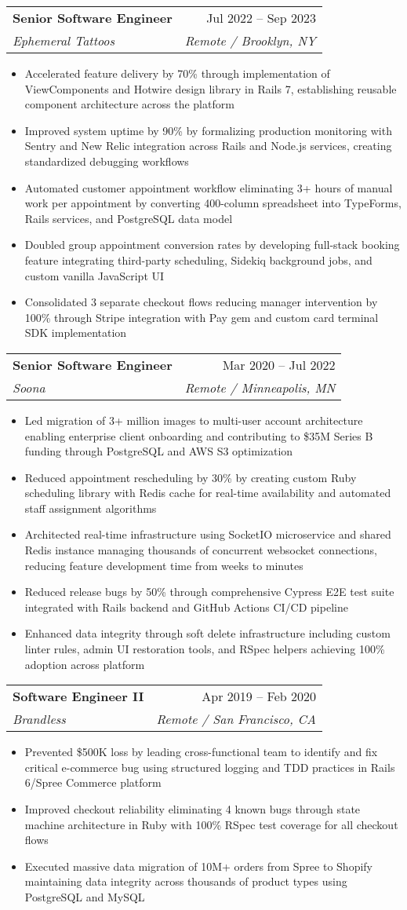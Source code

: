 \documentclass[letterpaper,12pt]{article}
\makeatletter
\newcommand{\resumeItem}[1]{
  \item\small{
    {#1 \vspace{-2pt}}
  }
}
\newcommand{\resumeSubheading}[4]{
  \vspace{-2pt}\item
    \begin{tabular*}{0.97\textwidth}[t]{l@{\extracolsep{\fill}}r}
      \textbf{#1} & #2 \\
      \textit{\small#3} & \textit{\small #4} \\
    \end{tabular*}\vspace{-7pt}
}
\newcommand{\resumeItemListStart}{\begin{itemize}}
\newcommand{\resumeItemListEnd}{\end{itemize}\vspace{-5pt}}
\makeatother
\begin{document}
    \resumeSubheading
      {Senior Software Engineer}{Jul 2022 – Sep 2023}
      {Ephemeral Tattoos}{Remote / Brooklyn, NY}
      \resumeItemListStart
        \resumeItem{Accelerated feature delivery by 70\% through implementation of ViewComponents and Hotwire design library in Rails 7, establishing reusable component architecture across the platform}
        \resumeItem{Improved system uptime by 90\% by formalizing production monitoring with Sentry and New Relic integration across Rails and Node.js services, creating standardized debugging workflows}
        \resumeItem{Automated customer appointment workflow eliminating 3+ hours of manual work per appointment by converting 400-column spreadsheet into TypeForms, Rails services, and PostgreSQL data model}
        \resumeItem{Doubled group appointment conversion rates by developing full-stack booking feature integrating third-party scheduling, Sidekiq background jobs, and custom vanilla JavaScript UI}
        \resumeItem{Consolidated 3 separate checkout flows reducing manager intervention by 100\% through Stripe integration with Pay gem and custom card terminal SDK implementation}
      \resumeItemListEnd

    \resumeSubheading
      {Senior Software Engineer}{Mar 2020 – Jul 2022}
      {Soona}{Remote / Minneapolis, MN}
      \resumeItemListStart
        \resumeItem{Led migration of 3+ million images to multi-user account architecture enabling enterprise client onboarding and contributing to \$35M Series B funding through PostgreSQL and AWS S3 optimization}
        \resumeItem{Reduced appointment rescheduling by 30\% by creating custom Ruby scheduling library with Redis cache for real-time availability and automated staff assignment algorithms}
        \resumeItem{Architected real-time infrastructure using SocketIO microservice and shared Redis instance managing thousands of concurrent websocket connections, reducing feature development time from weeks to minutes}
        \resumeItem{Reduced release bugs by 50\% through comprehensive Cypress E2E test suite integrated with Rails backend and GitHub Actions CI/CD pipeline}
        \resumeItem{Enhanced data integrity through soft delete infrastructure including custom linter rules, admin UI restoration tools, and RSpec helpers achieving 100\% adoption across platform}
      \resumeItemListEnd

    \resumeSubheading
      {Software Engineer II}{Apr 2019 – Feb 2020}
      {Brandless}{Remote / San Francisco, CA}
      \resumeItemListStart
        \resumeItem{Prevented \$500K loss by leading cross-functional team to identify and fix critical e-commerce bug using structured logging and TDD practices in Rails 6/Spree Commerce platform}
        \resumeItem{Improved checkout reliability eliminating 4 known bugs through state machine architecture in Ruby with 100\% RSpec test coverage for all checkout flows}
        \resumeItem{Executed massive data migration of 10M+ orders from Spree to Shopify maintaining data integrity across thousands of product types using PostgreSQL and MySQL}
      \resumeItemListEnd
\end{document}
